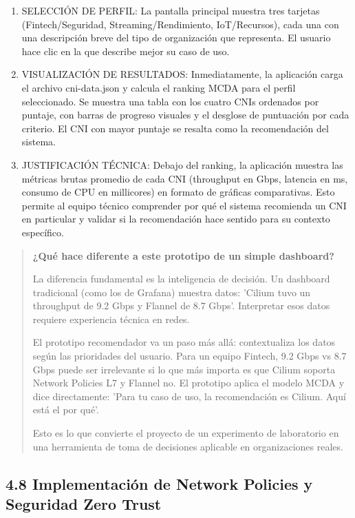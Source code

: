 \documentclass[journal]{IEEEtran}
\begin{document}
\begin{enumerate}

\item SELECCIÓN DE PERFIL: La pantalla principal muestra tres tarjetas (Fintech/Seguridad, Streaming/Rendimiento, IoT/Recursos), cada una con una descripción breve del tipo de organización que representa. El usuario hace clic en la que describe mejor su caso de uso.

\item VISUALIZACIÓN DE RESULTADOS: Inmediatamente, la aplicación carga el archivo cni-data.json y calcula el ranking MCDA para el perfil seleccionado. Se muestra una tabla con los cuatro CNIs ordenados por puntaje, con barras de progreso visuales y el desglose de puntuación por cada criterio. El CNI con mayor puntaje se resalta como la recomendación del sistema.

\item JUSTIFICACIÓN TÉCNICA: Debajo del ranking, la aplicación muestra las métricas brutas promedio de cada CNI (throughput en Gbps, latencia en ms, consumo de CPU en millicores) en formato de gráficas comparativas. Esto permite al equipo técnico comprender por qué el sistema recomienda un CNI en particular y validar si la recomendación hace sentido para su contexto específico.

\end{enumerate}

\begin{quote}
\textbf{¿Qué hace diferente a este prototipo de un simple dashboard?}

La diferencia fundamental es la inteligencia de decisión. Un dashboard tradicional (como los de Grafana) muestra datos: 'Cilium tuvo un throughput de 9.2 Gbps y Flannel de 8.7 Gbps'. Interpretar esos datos requiere experiencia técnica en redes.

El prototipo recomendador va un paso más allá: contextualiza los datos según las prioridades del usuario. Para un equipo Fintech, 9.2 Gbps vs 8.7 Gbps puede ser irrelevante si lo que más importa es que Cilium soporta Network Policies L7 y Flannel no. El prototipo aplica el modelo MCDA y dice directamente: 'Para tu caso de uso, la recomendación es Cilium. Aquí está el por qué'.

Esto es lo que convierte el proyecto de un experimento de laboratorio en una herramienta de toma de decisiones aplicable en organizaciones reales.
\end{quote}

\subsection{4.8 Implementación de Network Policies y Seguridad Zero Trust}
\end{document}
